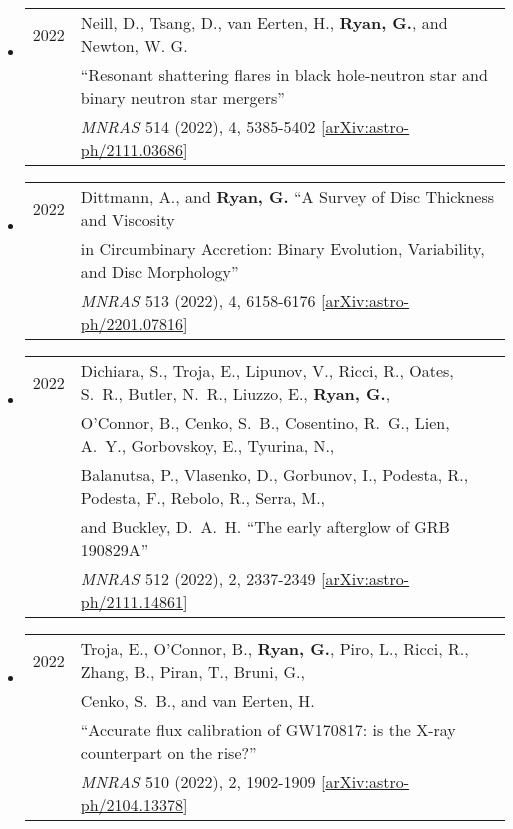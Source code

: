 \begin{itemize}
\item \begin{tabular}{ll}
2022 & {Neill}, D., {Tsang}, D., {van Eerten}, H., {\bf {Ryan}, G.}, and {Newton}, W. G.  \\
	&``Resonant shattering flares in black hole-neutron star and binary neutron star mergers'' \\
	& \emph{MNRAS} 514 (2022), 4, 5385-5402 [\href{https://arxiv.org/abs/2111.03686}{arXiv:astro-ph/2111.03686}]\\
\end{tabular}

\item \begin{tabular}{ll}
2022 & {Dittmann}, A., and {\bf {Ryan}, G.}  ``A Survey of Disc Thickness and Viscosity \\
	& in Circumbinary Accretion: Binary Evolution, Variability, and Disc Morphology'' \\
	& \emph{MNRAS} 513 (2022), 4, 6158-6176 [\href{https://arxiv.org/abs/2201.07816}{arXiv:astro-ph/2201.07816}]\\
\end{tabular}	

\item \begin{tabular}{ll}
2022 & {Dichiara}, S., {Troja}, E., {Lipunov}, V., {Ricci}, R., {Oates}, S.~R., {Butler}, N.~R., {Liuzzo}, E., {\bf{Ryan}, G.},\\
	& {O'Connor}, B., {Cenko}, S.~B., {Cosentino}, R.~G., {Lien}, A.~Y., {Gorbovskoy}, E., {Tyurina}, N., \\
	& {Balanutsa}, P., {Vlasenko}, D., {Gorbunov}, I., {Podesta}, R., {Podesta}, F., {Rebolo}, R., {Serra}, M.,\\
	&  and {Buckley}, D.~A.~H. ``The early afterglow of GRB 190829A''\\
	& \emph{MNRAS} 512 (2022), 2, 2337-2349 [\href{https://arxiv.org/abs/2111.14861}{arXiv:astro-ph/2111.14861}]
\end{tabular}

\item \begin{tabular}{ll}
2022 &{Troja}, E., {O'Connor}, B., {\bf{Ryan}, G.}, {Piro}, L., {Ricci}, R., {Zhang}, B., {Piran}, T., {Bruni}, G.,\\
	& {Cenko}, S.~B., and {van Eerten}, H.\\
	& ``Accurate flux calibration of GW170817: is the X-ray counterpart on the rise?''\\
	& \emph{MNRAS} 510 (2022), 2, 1902-1909 [\href{https://arxiv.org/abs/2104.13378}{arXiv:astro-ph/2104.13378}]
\end{tabular}


\end{itemize}
